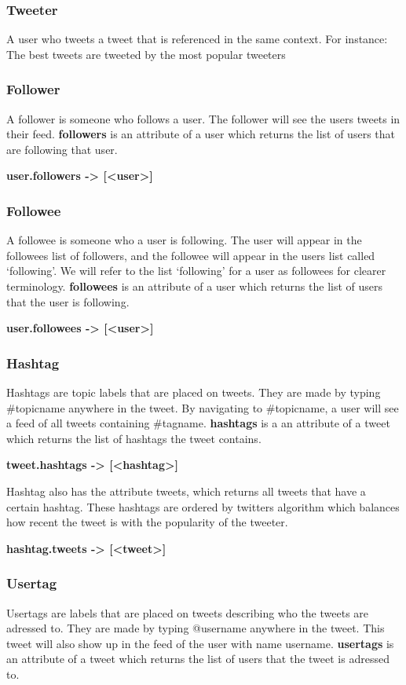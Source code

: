 \subsubsection{Tweeter}
A user who tweets a tweet that is referenced in the same context. For instance: The best tweets are tweeted by the most popular tweeters


\subsubsection{Follower}
A follower is someone who follows a user. The follower will see the users tweets in their feed. \textbf{followers} is an attribute of a user which returns the list of users that are following that user.

  \textbf{user.followers -> [<user>]}

\subsubsection{Followee}
A followee is someone who a user is following. The user will appear in the followees list of followers, and the followee will appear in the users list called ‘following’. We will refer to the list ‘following’ for a user as followees for clearer terminology. \textbf{followees} is an attribute of a user which returns the list of users that the user is following.

  \textbf{user.followees -> [<user>]}

\subsubsection{Hashtag}
Hashtags are topic labels that are placed on tweets. They are made by typing \#topicname anywhere in the tweet. By navigating to \#topicname, a user will see a feed of all tweets containing \#tagname. \textbf{hashtags} is a an attribute of a tweet which returns the list of hashtags the tweet contains.

  \textbf{tweet.hashtags -> [<hashtag>]}

\noindent
Hashtag also has the attribute tweets, which returns all tweets that have a certain hashtag. These hashtags are ordered by twitters algorithm which balances how recent the tweet is with the popularity of the tweeter.

  \textbf{hashtag.tweets -> [<tweet>]}

\subsubsection{Usertag}
Usertags are labels that are placed on tweets describing who the tweets are adressed to. They are made by typing @username anywhere in the tweet. This tweet will also show up in the feed of the user with name username. \textbf{usertags} is an attribute of a tweet which returns the list of users that the tweet is adressed to.

